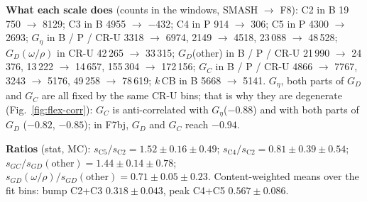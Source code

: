 \documentclass[11pt,a4paper]{article}
\newcommand{\Geta}{\ensuremath{G_\eta}\xspace}
\begin{document}
\textbf{What each scale does} (counts in the windows, SMASH $\to$ F8): C2 in B 19\,750 $\to$ 8129; C3 in B 4955 $\to$ $-432$; C4 in P 914 $\to$ 306; C5 in
P 4300 $\to$ 2693; \Geta in B / P / CR-U 3318 $\to$ 6974, 2149 $\to$ 4518, 23\,088 $\to$ 48\,528; $G_D(\omega/\rho)$ in CR-U 42\,265 $\to$ 33\,315;
$G_D$(other) in B / P / CR-U 21\,990 $\to$ 24\,376, 13\,222 $\to$ 14\,657, 155\,304 $\to$ 172\,156; $G_C$ in B / P / CR-U 4866 $\to$ 7767, 3243 $\to$ 5176,
49\,258 $\to$ 78\,619; $k\,$CB in B 5668 $\to$ 5141. \Geta, both parts of $G_D$ and $G_C$ are all fixed by the same CR-U bins; that is why they are
degenerate (Fig.~\ref{fig:flex-corr}): $G_C$ is anti-correlated with \Geta ($-0.88$) and with both parts of $G_D$ ($-0.82$, $-0.85$); in F7bj, $G_D$
and $G_C$ reach $-0.94$.

\textbf{Ratios} (stat, MC): $s_{\mathrm{C5}}/s_{\mathrm{C2}}=1.52\pm0.16\pm0.49$; $s_{\mathrm{C4}}/s_{\mathrm{C2}}=0.81\pm0.39\pm0.54$;
$s_{GC}/s_{GD}(\mathrm{other})=1.44\pm0.14\pm0.78$; $s_{GD}(\omega/\rho)/s_{GD}(\mathrm{other})=0.71\pm0.05\pm0.23$. Content-weighted means over the
fit bins: bump C2+C3 $0.318\pm0.043$, peak C4+C5 $0.567\pm0.086$.
\end{document}
